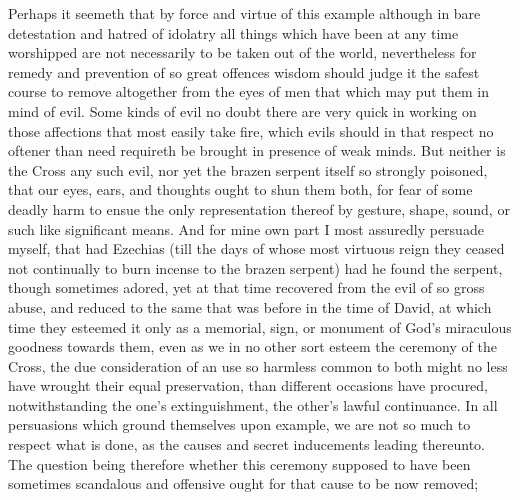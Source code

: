 Perhaps it seemeth that by force and virtue of this example although in bare detestation and hatred of idolatry all things which have been at any time worshipped are not necessarily to be taken out of the world, nevertheless for remedy and prevention of so great offences wisdom should judge it the safest course to remove altogether from the eyes of men that which may put them in mind of evil.
Some kinds of evil no doubt there are very quick in working on those affections that most easily take fire, which evils should in that respect no oftener than need requireth be brought in presence of weak minds. But neither is the Cross any such evil, nor yet the brazen serpent itself so strongly poisoned, that our eyes, ears, and thoughts ought to shun them both, for fear of some deadly harm to ensue the only representation thereof by gesture, shape, sound, or such like significant means. And for mine own part I most assuredly persuade myself, that had Ezechias (till the days of whose most virtuous reign they ceased not continually to burn incense to the brazen serpent) had he found the serpent, though sometimes adored, yet at that time recovered from the evil of so gross abuse, and reduced to the same that was before in the time of David, at which time they esteemed it only as a memorial, sign, or monument of God’s miraculous goodness towards them, even as we in no other sort esteem the ceremony of the Cross, the due consideration of an use so harmless common to both might no less have wrought their equal preservation, than different occasions have procured, notwithstanding the one’s extinguishment, the other’s lawful continuance.
In all persuasions which ground themselves upon example, we are not so much to respect what is done, as the causes and secret inducements leading thereunto. The question being therefore whether this ceremony supposed to have  been sometimes scandalous and offensive ought for that cause to be now removed;
